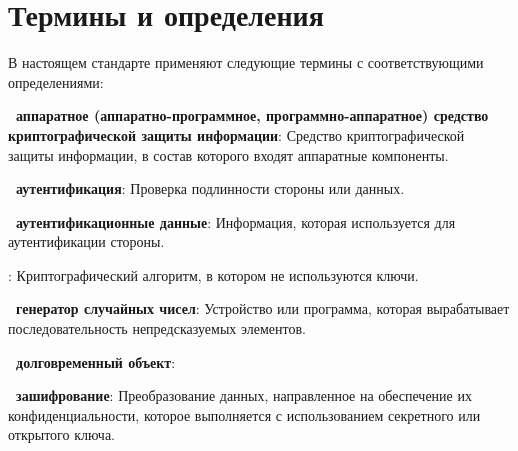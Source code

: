\chapter{Термины и определения}\label{Terms}

В настоящем стандарте применяют  
%
%
следующие термины с соответствующими определениями:

{\bf \thedefctr~аппаратное (аппаратно-программное, 
программно-аппаратное) средство криптографической защиты информации}:
Средство криптографической защиты информации, в состав которого входят 
аппаратные компоненты. 

{\bf \thedefctr~аутентификация}:
Проверка подлинности стороны или данных.


%
%

{\bf \thedefctr~аутентификационные данные}:
Информация, которая используется для аутентификации стороны.


:
Криптографический алгоритм, в котором не используются ключи.


{\bf \thedefctr~генератор случайных чисел}:
Устройство или программа, которая вырабатывает последовательность 
непредсказуемых элементов.


{\bf \thedefctr~долговременный объект}:


{\bf \thedefctr~зашифрование}:
Преобразование данных, направленное на обеспечение их конфиденциальности,
которое выполняется с использованием секретного или открытого ключа.

